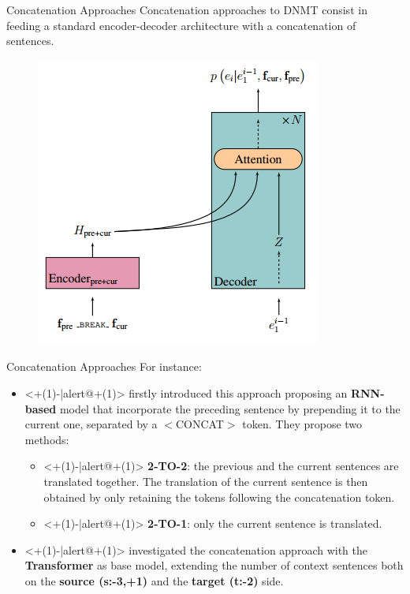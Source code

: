 \begin{frame}{Concatenation Approaches}
Concatenation approaches to DNMT consist in feeding a standard encoder-decoder architecture with a concatenation of sentences. 
	\begin{figure}
		\centering
		\includegraphics[width=0.45\linewidth]{Images/concatenation}
		\label{fig:concatenation}
	\end{figure}
\end{frame}

\begin{frame}{Concatenation Approaches}
For instance:
	\begin{itemize}
		\item<+(1)-|alert@+(1)> \cite{tiedemann_neural_2017} firstly introduced this approach proposing an \textbf{RNN-based} model that incorporate the preceding sentence by prepending it to the current one, separated by a $<$CONCAT$>$ token. They propose two methods:
			\begin{itemize}
				\item<+(1)-|alert@+(1)> \textbf{2-TO-2}: the previous and the current sentences are translated together. The translation of the current sentence is then obtained by only retaining the tokens following the concatenation token.
				\item<+(1)-|alert@+(1)> \textbf{2-TO-1}: only the current sentence is translated. 
			\end{itemize}
		\item<+(1)-|alert@+(1)> \cite{agrawal_contextual_2018,scherrer_analysing_2019} investigated the concatenation approach with the \textbf{Transformer} as base model, extending the number of context sentences both on the \textbf{source (s:-3,+1)} and the \textbf{target (t:-2)} side.
	\end{itemize}
\end{frame}

